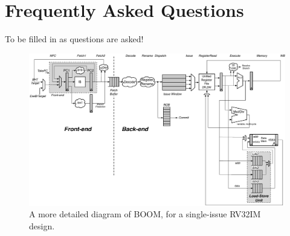 \documentclass[11pt, notitlepage]{report}
\begin{document}
\chapter{Frequently Asked Questions}

To be filled in as questions are asked!




\begin{figure}[ht]
	\centering
	\centerline{\includegraphics[scale =.9, angle=90] {figures/simple_boom_pipeline}}
	\caption{ \small A more detailed diagram of BOOM, for a single-issue RV32IM design.}
	\label{fig:boom-detailed}
\end{figure}








\end{document}
